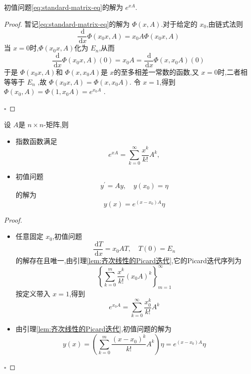 \documentclass[lang=cn,12pt,color=green,fontset=none]{elegantbook}
\begin{document}
\begin{proposition}
    初值问题\ref{eq:standard-matrix-eq}的解为 \(  e^{xA}  \). 
\end{proposition}

\begin{proof}
    暂记\ref{eq:standard-matrix-eq}的解为 \(  \Phi\left( x,A \right)   \).对于给定的 \(  x_0  \),由链式法则 \[
    \frac{\,\mathrm{d}  }{\,\mathrm{d} x }\Phi\left( x_0x,A \right) =  x_0 A\Phi\left( x_0x,A \right) 
    \]  当 \(  x=0  \)时,\(  \Phi\left( x_0x ,A\right)   \)化为 \(  E_{n}  \),从而 \[
    \frac{\,\mathrm{d}  }{\,\mathrm{d} x }\Phi\left( x_0x,A \right)\left( 0 \right) = x_0A = \frac{\,\mathrm{d}  }{\,\mathrm{d} x }\Phi\left( x,x_0A \right)\left( 0 \right)      
    \]  于是 \(  \Phi\left( x_0x,A \right)   \)和 \(  \Phi\left( x,x_0A \right)   \)是 \(  x  \)的至多相差一常数的函数,又 \(  x=0  \)时,二者相等等于 \(  E_{n}  \)     ,故 \(  \Phi\left( x_0x ,A\right)=\Phi\left( x,x_0A \right)    \).
    令 \(  x=1  \),得到 \(  \Phi\left( x_0,A \right)=\Phi\left( 1,x_0A \right)    =e^{x_0A}\) .  

    \hfill $\square$
\end{proof}

\begin{proposition}
    设 \(  A  \)是 \(  n\times n  \)-矩阵,则 
    \begin{itemize}
        \item 指数函数满足 \[
        e^{xA}=\sum _{k=0}^{\infty} \frac{x^{k} }{k! }A^{k}, 
        \]
        \item 初值问题\begin{equation}
            y^{\prime} =Ay,\quad y\left( x_0 \right)=\eta 
        \end{equation}的解为 \[
        y\left( x \right)=e^{\left( x-x_0 \right)A }\eta 
        \]
    \end{itemize}
      
\end{proposition}

\begin{proof}
   \begin{itemize}
    \item  任意固定 \(  x_0  \),初值问题 \[
        \frac{\,\mathrm{d} T }{\,\mathrm{d} x }=x_0AT,\quad T\left( 0 \right)=E_{n}  
        \] 的解存在且唯一,由引理\ref{lem:齐次线性的Picard迭代},它的Picard迭代序列为 \[
        \left\{ \sum _{k=0}^{m} \frac{x^{k} }{k! } \left( x_0A \right)^{k}  \right\}_{m=1}^{\infty}
        \]按定义带入 \(  x=1  \),得到 \[
        e^{x_0A}= \sum _{k=0}^{\infty} \frac{x_0^{k} }{k! }A^{k} 
        \] 
    \item 由引理\ref{lem:齐次线性的Picard迭代},初值问题的解为 \[
    y\left( x \right)= \left( \sum _{k=0}^{m} \frac{\left( x-x_0 \right)^{k}  }{k! }A^{k}  \right)\eta= e^{\left( x-x_0 \right)A }\eta  
    \]
   \end{itemize}
   
    \hfill $\square$
\end{proof}
\end{document}
